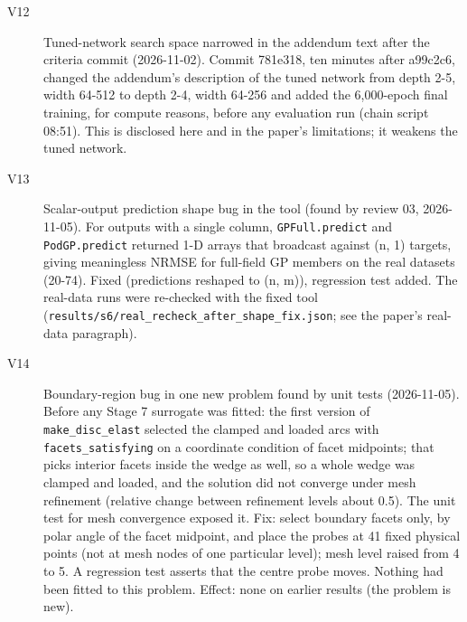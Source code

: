\begin{description}
\item[V12] Tuned-network search space narrowed in the addendum text after the criteria commit (2026-11-02). Commit 781e318, ten minutes after a99c2c6, changed the addendum's description of the tuned network from depth 2-5, width 64-512 to depth 2-4, width 64-256 and added the 6,000-epoch final training, for compute reasons, before any evaluation run (chain script 08:51). This is disclosed here and in the paper's limitations; it weakens the tuned network.
\item[V13] Scalar-output prediction shape bug in the tool (found by review 03, 2026-11-05). For outputs with a single column, \texttt{GPFull.predict} and \texttt{PodGP.predict} returned 1-D arrays that broadcast against (n, 1) targets, giving meaningless NRMSE for full-field GP members on the real datasets (20-74). Fixed (predictions reshaped to (n, m)), regression test added. The real-data runs were re-checked with the fixed tool (\texttt{results/\allowbreak{}s6/\allowbreak{}real\_\allowbreak{}recheck\_\allowbreak{}after\_\allowbreak{}shape\_\allowbreak{}fix.json}; see the paper's real-data paragraph).
\item[V14] Boundary-region bug in one new problem found by unit tests (2026-11-05). Before any Stage 7 surrogate was fitted: the first version of \texttt{make\_\allowbreak{}disc\_\allowbreak{}elast} selected the clamped and loaded arcs with \texttt{facets\_\allowbreak{}satisfying} on a coordinate condition of facet midpoints; that picks interior facets inside the wedge as well, so a whole wedge was clamped and loaded, and the solution did not converge under mesh refinement (relative change between refinement levels about 0.5). The unit test for mesh convergence exposed it. Fix: select boundary facets only, by polar angle of the facet midpoint, and place the probes at 41 fixed physical points (not at mesh nodes of one particular level); mesh level raised from 4 to 5. A regression test asserts that the centre probe moves. Nothing had been fitted to this problem. Effect: none on earlier results (the problem is new).

\end{description}

